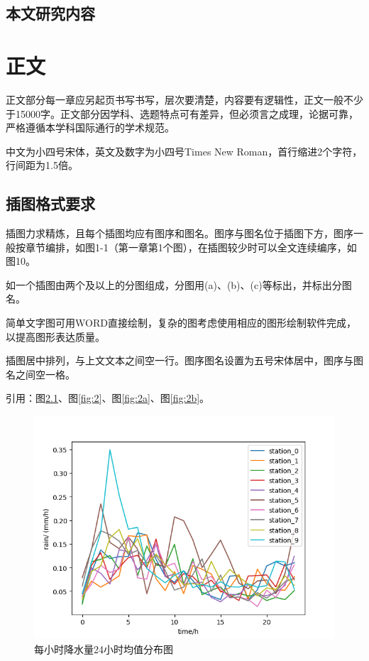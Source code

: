 \documentclass{seuthesis-2019}
\begin{document}
\section{本文研究内容}

\chapter{正文}
正文部分每一章应另起页书写书写，层次要清楚，内容要有逻辑性，正文一般不少于15000字。正文部分因学科、选题特点可有差异，但必须言之成理，论据可靠，严格遵循本学科国际通行的学术规范。

中文为小四号宋体，英文及数字为小四号Times New Roman，首行缩进2个字符，行间距为1.5倍。

\section{插图格式要求}
插图力求精炼，且每个插图均应有图序和图名。图序与图名位于插图下方，图序一般按章节编排，如图1-1（第一章第1个图），在插图较少时可以全文连续编序，如图10。

如一个插图由两个及以上的分图组成，分图用(a)、(b)、(c)等标出，并标出分图名。

简单文字图可用WORD直接绘制，复杂的图考虑使用相应的图形绘制软件完成，以提高图形表达质量。

插图居中排列，与上文文本之间空一行。图序图名设置为五号宋体居中，图序与图名之间空一格。

引用：图\ref{fig:1}、图\ref{fig:2}、图\ref{fig:2a}、图\ref{fig:2b}。

\begin{figure}[H]
    \centering
    \includegraphics[width=0.5\linewidth]{fig/降水量均值分布图.png}
    \caption{每小时降水量24小时均值分布图}
    \label{fig:1}
\end{figure}
\end{document}

